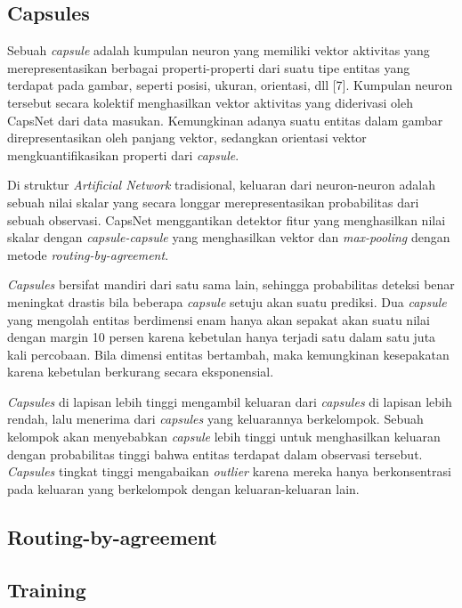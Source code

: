\documentclass{article}
\begin{document}
   	\subsection{Capsules}
   	Sebuah \textit{capsule} adalah kumpulan neuron yang memiliki vektor aktivitas yang merepresentasikan berbagai properti-properti dari suatu tipe entitas yang terdapat pada gambar, seperti posisi, ukuran, orientasi, dll [7]. Kumpulan neuron tersebut secara kolektif menghasilkan vektor aktivitas yang diderivasi oleh CapsNet dari data masukan. Kemungkinan adanya suatu entitas dalam gambar direpresentasikan oleh panjang vektor, sedangkan orientasi vektor mengkuantifikasikan properti dari \textit{capsule}. \par
   	Di struktur \textit{Artificial Network} tradisional, keluaran dari neuron-neuron adalah sebuah nilai skalar yang secara longgar merepresentasikan probabilitas dari sebuah observasi. CapsNet menggantikan detektor fitur yang menghasilkan nilai skalar dengan \textit{capsule-capsule} yang menghasilkan vektor dan \textit{max-pooling} dengan metode \textit{routing-by-agreement}. \par
   	\textit{Capsules} bersifat mandiri dari satu sama lain, sehingga probabilitas deteksi benar meningkat drastis bila beberapa \textit{capsule} setuju akan suatu prediksi. Dua \textit{capsule} yang mengolah entitas berdimensi enam hanya akan sepakat akan suatu nilai dengan margin 10 persen karena kebetulan hanya terjadi satu dalam satu juta kali percobaan. Bila dimensi entitas bertambah, maka kemungkinan kesepakatan karena kebetulan berkurang secara eksponensial. \par
   	\textit{Capsules} di lapisan lebih tinggi mengambil keluaran dari \textit{capsules} di lapisan lebih rendah, lalu menerima dari \textit{capsules} yang keluarannya berkelompok. Sebuah kelompok akan menyebabkan \textit{capsule} lebih tinggi untuk menghasilkan keluaran dengan probabilitas tinggi bahwa entitas terdapat dalam observasi tersebut. \textit{Capsules} tingkat tinggi mengabaikan \textit{outlier} karena mereka hanya berkonsentrasi pada keluaran yang berkelompok dengan keluaran-keluaran lain.
   	
   	\subsection{Routing-by-agreement}
   	
   	\subsection{Training}
   	
\end{document}
